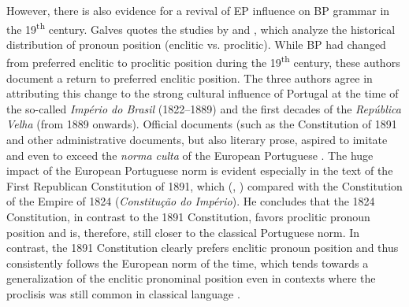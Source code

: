 \documentclass[output=paper,colorlinks,citecolor=brown]{langscibook}
\begin{document}
However, there is also evidence for a revival of EP influence on BP grammar in the 19\textsuperscript{th} century. Galves quotes the studies by \citet{Carneiro2005} and \citet{Pagotto1992}, which analyze the historical distribution of pronoun position (enclitic vs. proclitic). While BP had changed from preferred enclitic to proclitic position during the 19\textsuperscript{th} century, these authors document a return to preferred enclitic position. The three authors agree in attributing this change to the strong cultural influence of Portugal at the time of the so-called \textit{Império do Brasil} (1822--1889) and the first decades of the \textit{República Velha} (from 1889 onwards). Official documents (such as the Constitution of 1891 and other administrative documents, but also literary prose, aspired to imitate and even to exceed the \textit{norma culta} of the European Portuguese \parencite[see][51--53]{Pagotto1998}. The huge impact of the European Portuguese norm is evident especially in the text of the First Republican Constitution of 1891, which \citeauthor{Pagotto1992} (\citeyear{Pagotto1992}, \citeyear{Pagotto1998}) compared with the Constitution of the Empire of 1824 (\textit{Constitução do Império}). He concludes that the 1824 Constitution, in contrast to the 1891 Constitution, favors proclitic pronoun position and is, therefore, still closer to the classical Portuguese norm. In contrast, the 1891 Constitution clearly prefers enclitic pronoun position and thus consistently follows the European norm of the time, which tends towards a generalization of the enclitic pronominal position even in contexts where the proclisis was still common in classical language \parencite[51--53]{Pagotto1998}. 
\end{document}
